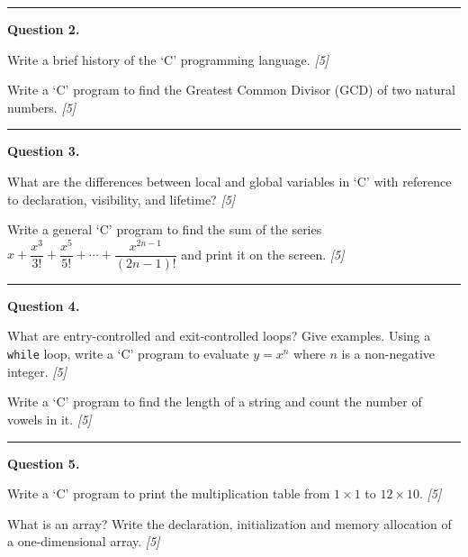 \documentclass[11pt,a4paper]{article}
\newcommand{\pts}[1]{\hfill   \textit{[#1]}}
\begin{document}
\medskip\rule{\linewidth}{0.2pt}

\medskip


\noindent   \textbf{Question 2.}

\begin{parts}
  \item Write a brief history of the `C' programming language. \pts{5}
  \item Write a `C' program to find the Greatest Common Divisor (GCD) of two natural numbers. \pts{5}
\end{parts}

\medskip\rule{\linewidth}{0.2pt}

\medskip


\noindent   \textbf{Question 3.}

\begin{parts}
  \item What are the differences between local and global variables in `C' with reference to declaration, visibility, and lifetime? \pts{5}
  \item Write a general `C' program to find the sum of the series $x + \dfrac{x^3}{3!} + \dfrac{x^5}{5!} + \cdots + \dfrac{x^{2n-1}}{(2n-1)!}$ and print it on the screen. \pts{5}
\end{parts}

\medskip\rule{\linewidth}{0.2pt}

\medskip


\noindent   \textbf{Question 4.}

\begin{parts}
  \item What are entry-controlled and exit-controlled loops? Give examples. Using a   \texttt{while} loop, write a `C' program to evaluate $y = x^n$ where $n$ is a non-negative integer. \pts{5}
  \item Write a `C' program to find the length of a string and count the number of vowels in it. \pts{5}
\end{parts}

\medskip\rule{\linewidth}{0.2pt}

\medskip


\noindent   \textbf{Question 5.}

\begin{parts}
  \item Write a `C' program to print the multiplication table from $1 \times 1$ to $12  \times 10$. \pts{5}
  \item What is an array? Write the declaration, initialization and memory allocation of a one-dimensional array. \pts{5}
\end{parts}
\end{document}
